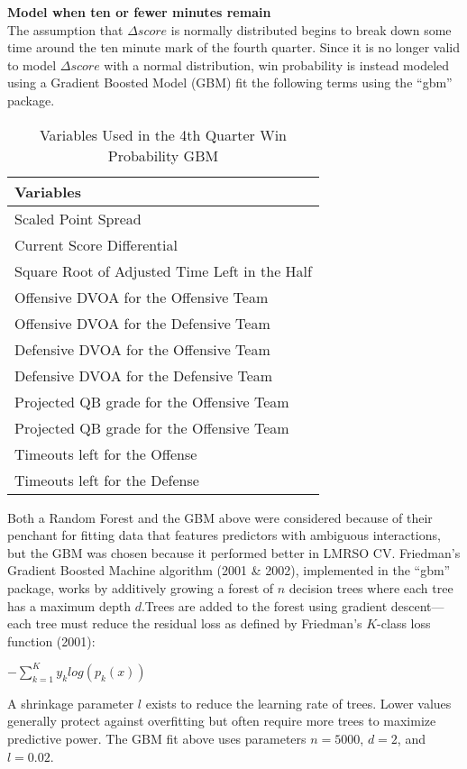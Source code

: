 \documentclass[12pt,twoside]{dukestatscithesis}
\begin{document}
\textbf{Model when ten or fewer minutes remain}\\
The assumption that \(\Delta score\) is normally distributed begins to break down some time around the ten minute mark of the fourth quarter. Since it is no longer valid to model \(\Delta score\) with a normal distribution, win probability is instead modeled using a Gradient Boosted Model (GBM) fit the following terms using the ``gbm'' package.
\begin{longtable}[t]{l}
\caption{\label{tab:win-prob-vars}Variables Used in the 4th Quarter Win Probability GBM}\\
\toprule
Variables\\
\midrule
Scaled Point Spread\\
Current Score Differential\\
Square Root of Adjusted Time Left in the Half\\
Offensive DVOA for the Offensive Team\\
Offensive DVOA for the Defensive Team\\
\addlinespace
Defensive DVOA for the Offensive Team\\
Defensive DVOA for the Defensive Team\\
Projected QB grade for the Offensive Team\\
Projected QB grade for the Offensive Team\\
Timeouts left for the Offense\\
Timeouts left for the Defense\\
\bottomrule
\end{longtable}
Both a Random Forest and the GBM above were considered because of their penchant for fitting data that features predictors with ambiguous interactions, but the GBM was chosen because it performed better in LMRSO CV. Friedman's Gradient Boosted Machine algorithm (2001 \& 2002), implemented in the ``gbm'' package, works by additively growing a forest of \(n\) decision trees where each tree has a maximum depth \(d\).Trees are added to the forest using gradient descent---each tree must reduce the residual loss as defined by Friedman's \(K\)-class loss function (2001):

\(-\sum_{k=1}^Ky_klog(p_k(x))\)

A shrinkage parameter \(l\) exists to reduce the learning rate of trees. Lower values generally protect against overfitting but often require more trees to maximize predictive power. The GBM fit above uses parameters \(n = 5000\), \(d = 2\), and \(l = 0.02\).
\end{document}
